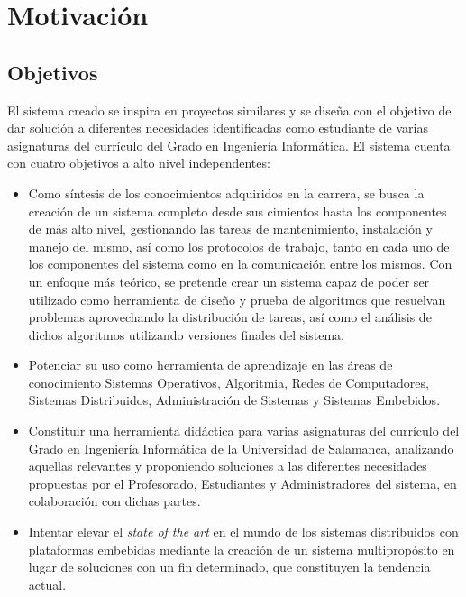 \chapter{Motivación}

\section{Objetivos}

El sistema creado se inspira en proyectos similares y se diseña con el objetivo de dar solución a diferentes necesidades identificadas como estudiante de varias asignaturas del currículo del Grado en Ingeniería Informática. El sistema cuenta con cuatro objetivos a alto nivel independentes:

\begin{itemize}
	\item Como síntesis de los conocimientos adquiridos en la carrera, se busca la creación de un sistema completo desde sus cimientos hasta los componentes de más alto nivel, gestionando las tareas de mantenimiento, instalación y manejo del mismo, así como los protocolos de trabajo, tanto en cada uno de los componentes del sistema como en la comunicación entre los mismos. Con un enfoque más teórico, se pretende crear un sistema capaz de poder ser utilizado como herramienta de diseño y prueba de algoritmos que resuelvan problemas aprovechando la distribución de tareas, así como el análisis de dichos algoritmos utilizando versiones finales del sistema.

	\item Potenciar su uso como herramienta de aprendizaje en las áreas de conocimiento Sistemas Operativos, Algoritmia, Redes de Computadores, Sistemas Distribuidos, Administración de Sistemas y Sistemas Embebidos.
	
	\item Constituir una herramienta didáctica para varias asignaturas del currículo del Grado en Ingeniería Informática de la Universidad de Salamanca, analizando aquellas relevantes y proponiendo soluciones a las diferentes necesidades propuestas por el Profesorado, Estudiantes y Administradores del sistema, en colaboración con dichas partes.

	\item Intentar elevar el \textit{state of the art} en el mundo de los sistemas distribuidos con plataformas embebidas mediante la creación de un sistema multipropósito en lugar de soluciones con un fin determinado, que constituyen la tendencia actual.
\end{itemize}

